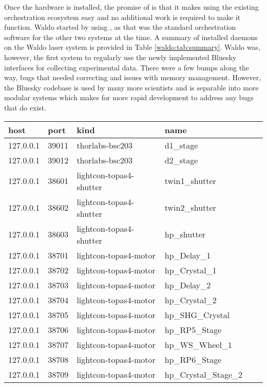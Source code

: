 Once the hardware is installed, the promise of \yaq{} is that it makes using the existing orchestration ecosystem easy and no additional work is required to make it function.
Waldo started by using \yaqccmds{}, as that was the standard orchestration software for the other two systems at the time.
A summary of installed \yaq{} daemons on the Waldo laser system is provided in Table \ref{waldo:tab:summary}.
Waldo was, however, the first system to regularly use the newly implemented Bluesky interfaces for collecting experimental data.
There were a few bumps along the way, bugs that needed correcting and issues with memory management.
However, the Bluesky codebase is used by many more scientists and is separable into more modular systems which makes for more rapid development to address any bugs that do exist.

\begin{table}[]
\begin{tabular}{llllll}
\hline
host      & port  & kind                    & name               \\ \hline
127.0.0.1 & 39011 & thorlabs-bsc203         & d1\_stage          \\
127.0.0.1 & 39012 & thorlabs-bsc203         & d2\_stage          \\
127.0.0.1 & 38601 & lightcon-topas4-shutter & twin1\_shutter     \\
127.0.0.1 & 38602 & lightcon-topas4-shutter & twin2\_shutter     \\
127.0.0.1 & 38603 & lightcon-topas4-shutter & hp\_shutter        \\
127.0.0.1 & 38701 & lightcon-topas4-motor   & hp\_Delay\_1       \\
127.0.0.1 & 38702 & lightcon-topas4-motor   & hp\_Crystal\_1     \\
127.0.0.1 & 38703 & lightcon-topas4-motor   & hp\_Delay\_2       \\
127.0.0.1 & 38704 & lightcon-topas4-motor   & hp\_Crystal\_2     \\
127.0.0.1 & 38705 & lightcon-topas4-motor   & hp\_SHG\_Crystal   \\
127.0.0.1 & 38706 & lightcon-topas4-motor   & hp\_RP5\_Stage     \\
127.0.0.1 & 38707 & lightcon-topas4-motor   & hp\_WS\_Wheel\_1   \\
127.0.0.1 & 38708 & lightcon-topas4-motor   & hp\_RP6\_Stage     \\
127.0.0.1 & 38709 & lightcon-topas4-motor   & hp\_Crystal\_Stage\_2 \\

\end{tabular}
\end{table}
